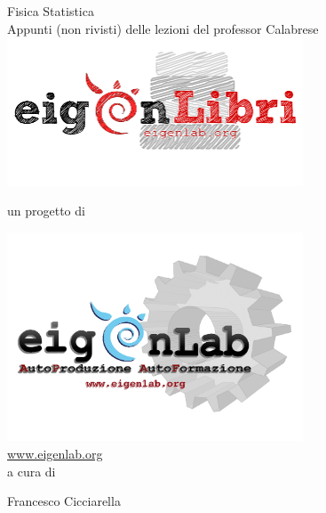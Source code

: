 \documentclass[10pt,a4paper]{report}
\theoremstyle{definition}
\numberwithin{equation}{section}
\begin{document}
\begin{titlepage}
\centering
{\Huge Fisica Statistica}\\
\vspace*{0.5cm}
{\small Appunti (non rivisti) delle lezioni del professor Calabrese}
 \\
\includegraphics[width=250pt,keepaspectratio=true]{Addons/eigenLibrichiaro}
\begin{center}
un progetto di
\end{center}
\includegraphics[width=250pt,keepaspectratio=true]{Addons/eigenlabinvertito2.png} \\
\url{www.eigenlab.org}
 \\
{\small a cura di}\\
\vspace*{0.5cm}
{\normalsize Francesco Cicciarella\par}
\end{titlepage}
\pagebreak
\end{document}
